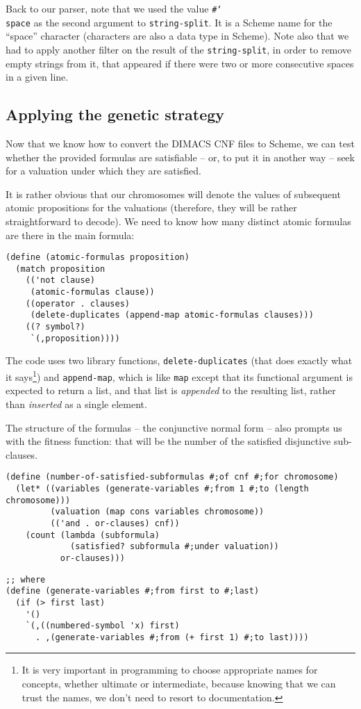 Back to our parser, note that we used the value
\texttt{\#\char`\\space} as the second argument to 
\texttt{string-split}. It is a Scheme name for the ``space'' character 
(characters are also a data type in Scheme). Note also
that we had to apply another filter on the result of the
\texttt{string-split}, in order to remove empty strings from it,
that appeared if there were two or more
consecutive spaces in a given line.

\subsection{Applying the genetic strategy}

Now that we know how to convert the DIMACS CNF files to Scheme,
we can test whether the provided formulas are satisfiable -- or,
to put it in another way -- seek for a valuation under which
they are satisfied.

It is rather obvious that our chromosomes will denote the
values of subsequent atomic propositions for the valuations
(therefore, they will be rather straightforward to decode).
We need to know how many distinct atomic formulas are there
in the main formula:

\begin{Verbatim}[samepage=true]
(define (atomic-formulas proposition)
  (match proposition
    (('not clause)
     (atomic-formulas clause))
    ((operator . clauses)
     (delete-duplicates (append-map atomic-formulas clauses)))
    ((? symbol?)
     `(,proposition))))
\end{Verbatim}

The code uses two library functions, \texttt{delete-duplicates}
(that does exactly what it says\footnote{
It is very important in programming to choose appropriate
names for concepts, whether ultimate or intermediate, because
knowing that we can trust the names, we don't need to resort
to documentation.
}) and \texttt{append-map}, which
is like \texttt{map} except that its functional argument is
expected to return a list, and that list is \textit{appended}
to the resulting list, rather than \textit{inserted} as
a single element.

The structure of the formulas -- the conjunctive normal
form -- also prompts us with the fitness function: that
will be the number of the satisfied disjunctive sub-clauses.

\begin{Verbatim}[samepage=true]
(define (number-of-satisfied-subformulas #;of cnf #;for chromosome)
  (let* ((variables (generate-variables #;from 1 #;to (length chromosome)))
         (valuation (map cons variables chromosome))
         (('and . or-clauses) cnf))
    (count (lambda (subformula)
             (satisfied? subformula #;under valuation))
           or-clauses)))
\end{Verbatim}
\begin{Verbatim}[samepage=true]
;; where
(define (generate-variables #;from first to #;last)
  (if (> first last)
    '()
    `(,((numbered-symbol 'x) first) 
      . ,(generate-variables #;from (+ first 1) #;to last))))
\end{Verbatim}

